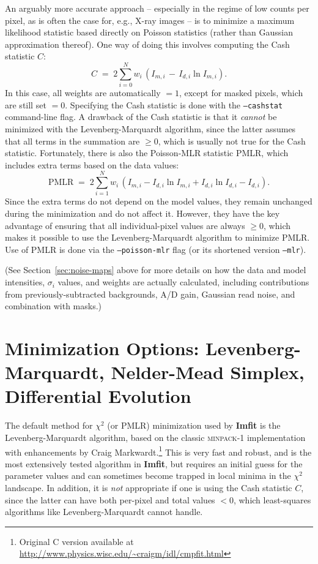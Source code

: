 \documentclass[10pt,a4paper,article]{memoir}
\newcommand{\imfit}{\textbf{Imfit}}
\newcommand{\chisquare}{\ensuremath{\chi^{2}}}
\newcommand{\pmlr}{PMLR}
\begin{document}
An arguably more accurate approach -- especially in the regime of low counts per pixel,
as is often the case for, e.g., X-ray images -- is to minimize a maximum likelihood 
statistic based directly on Poisson statistics (rather than Gaussian approximation thereof). 
One way of doing this involves computing the Cash statistic $C$:
\begin{equation}
C \; = \; 2 \sum_{i = 0}^{N} w_{i} \, (I_{m, i} \, - \, I_{d, i} \ln I_{m, i}) .
\end{equation}
In this case, all weights are automatically $=1$, except for masked pixels, which are still set $= 0$.
Specifying the Cash statistic is done with the \texttt{--cashstat} command-line flag.
A drawback of the Cash statistic is that it \textit{cannot} be minimized with the
Levenberg-Marquardt algorithm, since the latter assumes that all terms in the summation are
$\ge 0$, which is usually not true for the Cash statistic.  Fortunately, there is also the 
Poisson-MLR statistic \pmlr, which includes extra terms based on the data values:
\begin{equation}
\mathrm{\pmlr} \; = \;  2 \sum_{i = 1}^{N} w_{i} \, 
\left( I_{m, i} - I_{d, i} \ln I_{m, i} + I_{d, i} \ln I_{d, i} - I_{d, i} \right).
\end{equation}
Since the extra terms do not depend on the model values, they remain unchanged during
the minimization and do not affect it. However, they have
the key advantage of ensuring that all individual-pixel values are always $\ge 0$, which
makes it possible to use the Levenberg-Marquardt algorithm to minimize \pmlr.
Use of \pmlr{} is done via the \texttt{--poisson-mlr} flag (or its shortened
version \texttt{--mlr}).

(See Section~\ref{sec:noise-maps} above for more details on how the data
and model intensities, $\sigma_{i}$ values, and weights are actually
calculated, including contributions from previously-subtracted
backgrounds, A/D gain, Gaussian read noise, and combination with masks.)




\section{Minimization Options: Levenberg-Marquardt, Nelder-Mead Simplex, Differential Evolution}

The default method for \chisquare{} (or \pmlr) minimization
used by \imfit{} is the Levenberg-Marquardt algorithm, based on the
classic \textsc{minpack-1} implementation \citep{more78} with
enhancements by Craig Markwardt.\footnote{Original C version available
at \url{http://www.physics.wisc.edu/~craigm/idl/cmpfit.html}} This is
very fast and robust, and is the most extensively tested algorithm in
\imfit, but requires an initial guess for the parameter values and can
sometimes become trapped in local minima in the \chisquare{} landscape.
In addition, it is \textit{not} appropriate if one is using the Cash
statistic $C$, since the latter can have both per-pixel and total values
$< 0$, which least-squares algorithms like Levenberg-Marquardt cannot
handle.
\end{document}
